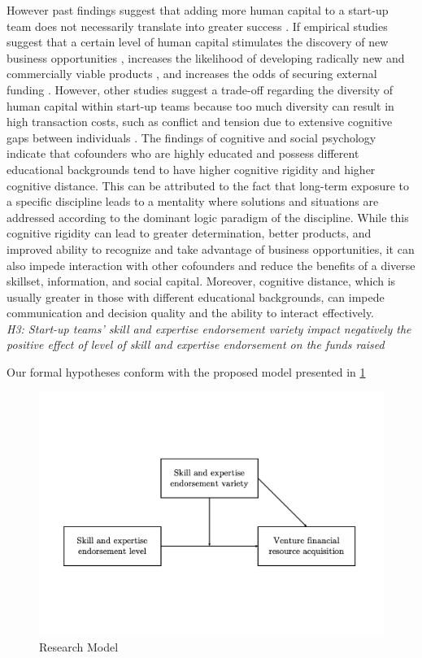 \documentclass[12pt]{article}
\begin{document}
However past findings suggest that adding more human capital to a start-up team does not necessarily translate into greater success \citep{pierce2013too}. If empirical studies suggest that a certain level of human capital stimulates the discovery of new business opportunities \citep{shane2000promise, marvel2016human}, increases the likelihood of developing radically new and commercially viable products \citep{marvel2007technology}, and increases the odds of securing external funding \citep{beckman2007early}. However, other studies suggest a trade-off regarding the diversity of human capital within start-up teams because too much diversity can result in high transaction costs, such as conflict and tension due to extensive cognitive gaps between individuals \citep{nooteboom2007optimal}. The findings of cognitive and social psychology indicate that cofounders who are highly educated and possess different educational backgrounds tend to have higher cognitive rigidity and higher cognitive distance. This can be attributed to the fact that long-term exposure to a specific discipline leads to a mentality where solutions and situations are addressed according to the dominant logic paradigm of the discipline. While this cognitive rigidity can lead to greater determination, better products, and improved ability to recognize and take advantage of business opportunities, it can also impede interaction with other cofounders and reduce the benefits of a diverse skillset, information, and social capital. Moreover, cognitive distance, which is usually greater in those with different educational backgrounds, can impede communication and decision quality and the ability to interact effectively. \\

\noindent \textit{H3: Start-up teams' skill and expertise endorsement variety impact negatively the positive effect of level of skill and expertise endorsement on the funds raised}

\clearpage
Our formal hypotheses conform with the proposed model presented in \ref{Figure1}

\begin{figure}
  \includegraphics[width=\linewidth]{model.pdf}
  \caption{Research Model}
  \label{Figure1}
\end{figure}
\end{document}
